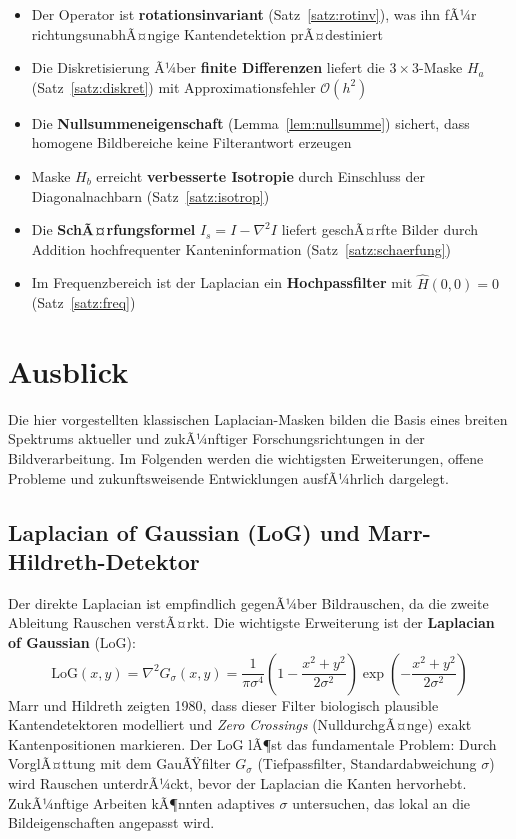 ﻿\documentclass[a4paper,12pt]{article}
\theoremstyle{definition}
\begin{document}
\begin{itemize}
    \item Der Operator ist \textbf{rotationsinvariant} (Satz~\ref{satz:rotinv}), was ihn fÃ¼r
          richtungsunabhÃ¤ngige Kantendetektion prÃ¤destiniert
    \item Die Diskretisierung Ã¼ber \textbf{finite Differenzen} liefert die $3\times3$-Maske $H_a$
          (Satz~\ref{satz:diskret}) mit Approximationsfehler $\mathcal{O}(h^2)$
    \item Die \textbf{Nullsummeneigenschaft} (Lemma~\ref{lem:nullsumme}) sichert, dass homogene
          Bildbereiche keine Filterantwort erzeugen
    \item Maske $H_b$ erreicht \textbf{verbesserte Isotropie} durch Einschluss der
          Diagonalnachbarn (Satz~\ref{satz:isotrop})
    \item Die \textbf{SchÃ¤rfungsformel} $I_s = I - \nabla^2 I$ liefert geschÃ¤rfte Bilder durch
          Addition hochfrequenter Kanteninformation (Satz~\ref{satz:schaerfung})
    \item Im Frequenzbereich ist der Laplacian ein \textbf{Hochpassfilter} mit
          $\hat{H}(0,0) = 0$ (Satz~\ref{satz:freq})
\end{itemize}

\section{Ausblick}

Die hier vorgestellten klassischen Laplacian-Masken bilden die Basis eines breiten Spektrums
aktueller und zukÃ¼nftiger Forschungsrichtungen in der Bildverarbeitung. Im Folgenden werden
die wichtigsten Erweiterungen, offene Probleme und zukunftsweisende Entwicklungen ausfÃ¼hrlich
dargelegt.

\subsection{Laplacian of Gaussian (LoG) und Marr-Hildreth-Detektor}

Der direkte Laplacian ist empfindlich gegenÃ¼ber Bildrauschen, da die zweite Ableitung Rauschen
verstÃ¤rkt. Die wichtigste Erweiterung ist der \textbf{Laplacian of Gaussian} (LoG):
\[
    \text{LoG}(x,y) = \nabla^2 G_\sigma(x,y)
    = \frac{1}{\pi \sigma^4}\left(1 - \frac{x^2+y^2}{2\sigma^2}\right)
      \exp\!\left(-\frac{x^2+y^2}{2\sigma^2}\right)
\]
Marr und Hildreth \cite{marr1980} zeigten 1980, dass dieser Filter biologisch plausible Kantendetektoren
modelliert und \emph{Zero Crossings} (NulldurchgÃ¤nge) exakt Kantenpositionen markieren. Der LoG
lÃ¶st das fundamentale Problem: Durch VorglÃ¤ttung mit dem GauÃŸfilter $G_\sigma$ (Tiefpassfilter,
Standardabweichung $\sigma$) wird Rauschen unterdrÃ¼ckt, bevor der Laplacian die Kanten hervorhebt.
ZukÃ¼nftige Arbeiten kÃ¶nnten adaptives $\sigma$ untersuchen, das lokal an die Bildeigenschaften
angepasst wird.
\end{document}
